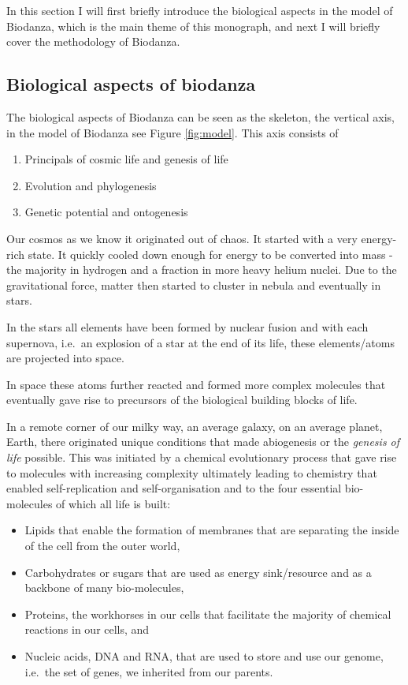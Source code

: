 \documentclass[
  11pt,
]{book}
\providecommand{\tightlist}{%
  \setlength{\itemsep}{0pt}\setlength{\parskip}{0pt}}
\begin{document}
In this section I will first briefly introduce the biological aspects in the model of Biodanza, which is the main theme of this monograph, and next I will briefly cover the methodology of Biodanza.

\hypertarget{biological-aspects-of-biodanza}{%
\subsection{Biological aspects of biodanza}\label{biological-aspects-of-biodanza}}

The biological aspects of Biodanza can be seen as the skeleton, the vertical axis, in the model of Biodanza see Figure \ref{fig:model}. This axis consists of

\begin{enumerate}
\def\labelenumi{\arabic{enumi}.}
\tightlist
\item
  Principals of cosmic life and genesis of life
\item
  Evolution and phylogenesis
\item
  Genetic potential and ontogenesis
\end{enumerate}

Our cosmos as we know it originated out of chaos. It started with a very energy-rich state. It quickly cooled down enough for energy to be converted into mass - the majority in hydrogen and a fraction in more heavy helium nuclei. Due to the gravitational force, matter then started to cluster in nebula and eventually in stars.

In the stars all elements have been formed by nuclear fusion and with each supernova, i.e.~an explosion of a star at the end of its life, these elements/atoms are projected into space.

In space these atoms further reacted and formed more complex molecules that eventually gave rise to precursors of the biological building blocks of life.

In a remote corner of our milky way, an average galaxy, on an average planet, Earth, there originated unique conditions that made abiogenesis or the \emph{genesis of life} possible.
This was initiated by a chemical evolutionary process that gave rise to molecules with increasing complexity ultimately leading to chemistry that enabled self-replication and self-organisation and to the four essential bio-molecules of which all life is built:

\begin{itemize}
\tightlist
\item
  Lipids that enable the formation of membranes that are separating the inside of the cell from the outer world,
\item
  Carbohydrates or sugars that are used as energy sink/resource and as a backbone of many bio-molecules,
\item
  Proteins, the workhorses in our cells that facilitate the majority of chemical reactions in our cells, and
\item
  Nucleic acids, DNA and RNA, that are used to store and use our genome, i.e.~the set of genes, we inherited from our parents.
\end{itemize}
\end{document}
